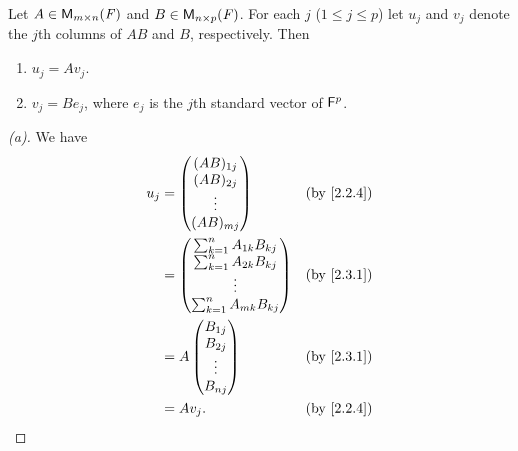 \begin{thm}\label{2.13}
  Let \(A \in \ms\) and \(B \in \ms[n][p][\F]\).
  For each \(j\) (\(1 \leq j \leq p\)) let \(u_j\) and \(v_j\) denote the \(j\)th columns of \(AB\) and \(B\), respectively.
  Then
  \begin{enumerate}
    \item \(u_j = A v_j\).
    \item \(v_j = B e_j\), where \(e_j\) is the \(j\)th standard vector of \(\mathsf{F}^p\).
  \end{enumerate}
\end{thm}

\begin{proof}[(a)]
  We have
  \begin{align*}
    u_j & = \begin{pmatrix}
              (AB)_{1 j} \\
              (AB)_{2 j} \\
              \vdots     \\
              (AB)_{m j}
            \end{pmatrix}                 &  & \by{2.2.4}   \\
        & = \begin{pmatrix}
              \sum_{k = 1}^n A_{1 k} B_{k j} \\
              \sum_{k = 1}^n A_{2 k} B_{k j} \\
              \vdots                         \\
              \sum_{k = 1}^n A_{m k} B_{k j}
            \end{pmatrix} &  & \by{2.3.1}                  \\
        & = A \begin{pmatrix}
                B_{1 j} \\
                B_{2 j} \\
                \vdots  \\
                B_{n j}
              \end{pmatrix}               &  & \by{2.3.1}   \\
        & = A v_j.                          &  & \by{2.2.4}
  \end{align*}
\end{proof}

